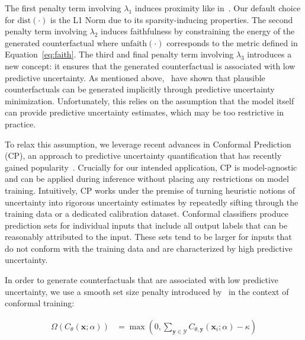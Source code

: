 \documentclass{article}
\begin{document}
The first penalty term involving $\lambda_1$ induces proximity like in~\citet{wachter2017counterfactual}. Our default choice for $\text{dist}(\cdot)$ is the L1 Norm due to its sparsity-inducing properties. The second penalty term involving $\lambda_2$ induces faithfulness by constraining the energy of the generated counterfactual where $\text{unfaith}(\cdot)$ corresponds to the metric defined in Equation~\ref{eq:faith}. The third and final penalty term involving $\lambda_3$ introduces a new concept: it ensures that the generated counterfactual is associated with low predictive uncertainty. As mentioned above,~\citet{schut2021generating} have shown that plausible counterfactuals can be generated implicitly through predictive uncertainty minimization. Unfortunately, this relies on the assumption that the model itself can provide predictive uncertainty estimates, which may be too restrictive in practice. 

To relax this assumption, we leverage recent advances in Conformal Prediction (CP), an approach to predictive uncertainty quantification that has recently gained popularity~\citep{angelopoulos2021gentle,manokhin2022awesome}. Crucially for our intended application, CP is model-agnostic and can be applied during inference without placing any restrictions on model training. Intuitively, CP works under the premise of turning heuristic notions of uncertainty into rigorous uncertainty estimates by repeatedly sifting through the training data or a dedicated calibration dataset. Conformal classifiers produce prediction sets for individual inputs that include all output labels that can be reasonably attributed to the input. These sets tend to be larger for inputs that do not conform with the training data and are characterized by high predictive uncertainty. 

In order to generate counterfactuals that are associated with low predictive uncertainty, we use a smooth set size penalty introduced by~\citet{stutz2022learning} in the context of conformal training:

\begin{equation}\label{eq:setsize}
  \begin{aligned}
    \Omega(C_{\theta}(\mathbf{x};\alpha))&=\max \left(0, \sum_{\mathbf{y}\in\mathcal{Y}}C_{\theta,\mathbf{y}}(\mathbf{x}_i;\alpha) - \kappa \right)
  \end{aligned}
\end{equation}
\end{document}
